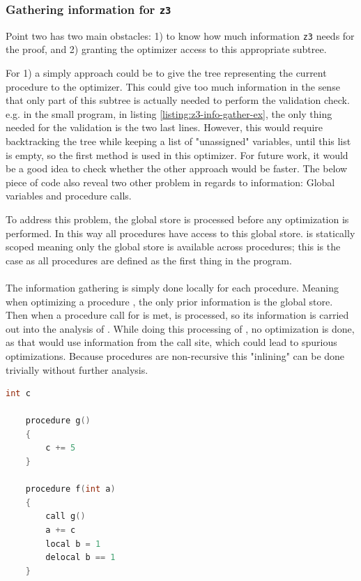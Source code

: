 \subsubsection{Gathering information for \texttt{z3} }
Point two has two main obstacles: 1) to know how much information \texttt{z3} needs for the proof,
and 2) granting the optimizer access to this appropriate subtree.

For 1) a simply approach could be to give the tree representing the current procedure to the
optimizer. This could give too much information in the sense that only part of this subtree is
actually needed to perform the validation check. e.g. in the small program, in listing
\ref{listing:z3-info-gather-ex}, the only thing
needed for the validation is the two last lines. However, this would require backtracking the
tree while keeping a list of "unassigned" variables, until this list is empty, so the first
method is used in this optimizer. For future work, it would be a good idea to check whether the
other approach would be faster. The below piece of code also reveal two other problem in regards
to information: Global variables and procedure calls.

To address this problem, the global store is processed before any optimization is performed.
In this way all procedures have access to this global store. \lan is statically scoped meaning
only the global store is available across procedures; this is the case as all procedures are
defined as the first thing in the program.
\\
\\
The information gathering is simply done locally for each procedure. Meaning when optimizing
a procedure , the only prior information is the global store. Then when a procedure
call for  is met,  is processed, so its information is carried out into
the analysis of . While doing this processing of , no optimization is done,
as that would use information from the call site, which could lead to spurious optimizations.
Because procedures are non-recursive this "inlining" can be done trivially without further
analysis.

\begin{lstlisting}[language=C++, label=listing:z3-info-gather-ex,
    caption=Example on gathering information for \texttt{z3} where only last two lines are needed.]
    int c

    procedure g()
    {
        c += 5
    }

    procedure f(int a)
    {
        call g()
        a += c
        local b = 1
        delocal b == 1
    }
\end{lstlisting}

